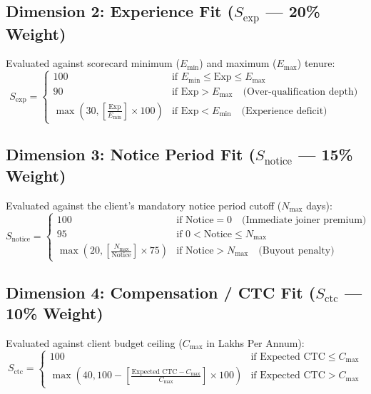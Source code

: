 \documentclass[11pt,a4paper,oneside]{report}
\begin{document}
\subsection{Dimension 2: Experience Fit ($S_{\text{exp}}$ --- 20\% Weight)}
Evaluated against scorecard minimum ($E_{\min}$) and maximum ($E_{\max}$) tenure:
\begin{equation}
    S_{\text{exp}} = 
    \begin{cases} 
      100 & \text{if } E_{\min} \le \text{Exp} \le E_{\max} \\
      90 & \text{if } \text{Exp} > E_{\max} \quad \text{(Over-qualification depth)} \\
      \max\left(30, \left[\frac{\text{Exp}}{E_{\min}}\right] \times 100\right) & \text{if } \text{Exp} < E_{\min} \quad \text{(Experience deficit)}
    \end{cases}
\end{equation}

\subsection{Dimension 3: Notice Period Fit ($S_{\text{notice}}$ --- 15\% Weight)}
Evaluated against the client's mandatory notice period cutoff ($N_{\max}$ days):
\begin{equation}
    S_{\text{notice}} = 
    \begin{cases} 
      100 & \text{if } \text{Notice} = 0 \quad \text{(Immediate joiner premium)} \\
      95 & \text{if } 0 < \text{Notice} \le N_{\max} \\
      \max\left(20, \left[\frac{N_{\max}}{\text{Notice}}\right] \times 75\right) & \text{if } \text{Notice} > N_{\max} \quad \text{(Buyout penalty)}
    \end{cases}
\end{equation}

\subsection{Dimension 4: Compensation / CTC Fit ($S_{\text{ctc}}$ --- 10\% Weight)}
Evaluated against client budget ceiling ($C_{\max}$ in Lakhs Per Annum):
\begin{equation}
    S_{\text{ctc}} = 
    \begin{cases} 
      100 & \text{if } \text{Expected CTC} \le C_{\max} \\
      \max\left(40, 100 - \left[\frac{\text{Expected CTC} - C_{\max}}{C_{\max}}\right] \times 100\right) & \text{if } \text{Expected CTC} > C_{\max}
    \end{cases}
\end{equation}
\end{document}
